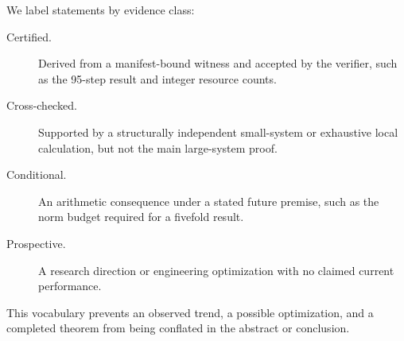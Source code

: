 We label statements by evidence class:
\begin{description}
  \item[Certified.] Derived from a manifest-bound witness and accepted by the
  verifier, such as the 95-step result and integer resource counts.
  \item[Cross-checked.] Supported by a structurally independent small-system or
  exhaustive local calculation, but not the main large-system proof.
  \item[Conditional.] An arithmetic consequence under a stated future premise,
  such as the norm budget required for a fivefold result.
  \item[Prospective.] A research direction or engineering optimization with no
  claimed current performance.
\end{description}
This vocabulary prevents an observed trend, a possible optimization, and a
completed theorem from being conflated in the abstract or conclusion.
